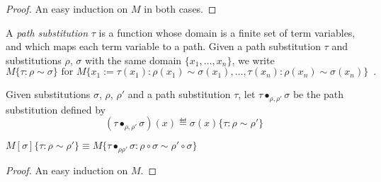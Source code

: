 \begin{proof}
An easy induction on $M$ in both cases.
\end{proof}

A \emph{path substitution} $\tau$ is a function whose domain is a finite set of term variables,
and which maps each term variable to a path.  Given a path substitution $\tau$ and substitutions $\rho$, $\sigma$
with the same domain $\{ x_1, \ldots, x_n \}$, we write
\[ M \{ \tau : \rho \sim \sigma \} \text{ for } M \{ x_1 := \tau(x_1) : \rho(x_1) \sim \sigma(x_1), \ldots, \tau(x_n) : \rho(x_n) \sim \sigma(x_n) \} \enspace . \]

Given substitutions $\sigma$, $\rho$, $\rho'$ and a path substitution $\tau$, let $\tau \bullet_{\rho, \rho'} \sigma$ be the path substitution defined by
\[ (\tau \bullet_{\rho, \rho'} \sigma)(x) \eqdef \sigma(x)\{ \tau : \rho \sim \rho' \} \]

\begin{lemma}
$M[\sigma]\{ \tau : \rho \sim \rho' \} \equiv
M\{ \tau \bullet_{\rho \rho'} \sigma : \rho \circ \sigma \sim \rho' \circ \sigma \}$
\end{lemma}

\begin{proof}
An easy induction on $M$.
\end{proof}